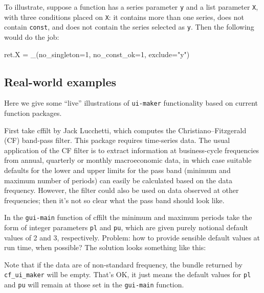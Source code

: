 \documentclass[oneside]{book}
\begin{document}
To illustrate, suppose a function has a series parameter \texttt{y}
and a list parameter \texttt{X}, with three conditions placed on
\texttt{X}: it contains more than one series, does not contain
\texttt{const}, and does not contain the series selected as
\texttt{y}. Then the following would do the job:
\begin{code}
ret.X = _(no_singleton=1, no_const_ok=1, exclude="y")
\end{code}

\subsection{Real-world examples}

Here we give some ``live'' illustrations of \texttt{ui-maker}
functionality based on current function packages.

First take \textsf{cffilt} by Jack Lucchetti, which computes the
Christiano--Fitzgerald (CF) band-pass filter. This package requires
time-series data. The usual application of the CF filter is to extract
information at business-cycle frequencies from annual, quarterly or
monthly macroeconomic data, in which case suitable defaults for the
lower and upper limits for the pass band (minimum and maximum number
of periods) can easily be calculated based on the data
frequency. However, the filter could also be used on data observed at
other frequencies; then it's not so clear what the pass band should
look like.

In the \texttt{gui-main} function of \textsf{cffilt} the minimum and
maximum periods take the form of integer parameters \texttt{pl} and
\texttt{pu}, which are given purely notional default values of 2 and
3, respectively. Problem: how to provide sensible default values at
run time, when possible? The solution looks something like this:


Note that if the data are of non-standard frequency, the bundle
returned by \texttt{cf\_ui\_maker} will be empty. That's OK, it just
means the default values for \texttt{pl} and \texttt{pu} will remain
at those set in the \texttt{gui-main} function.
\end{document}
